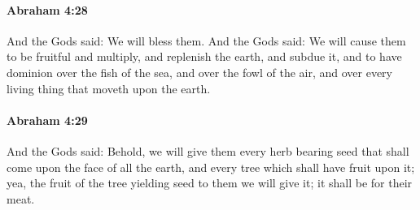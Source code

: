 
		\paragraph{Abraham 4:28} %
			\label{ABRAHAM-4-28}

			And the Gods said: We will bless them.  And the Gods said: We will cause them to be fruitful and multiply, and replenish the earth, and subdue it, and to have dominion over the fish of the sea, and over the fowl of the air, and over every living thing that moveth upon the earth.


		\paragraph{Abraham 4:29} %
			\label{ABRAHAM-4-29}

			And the Gods said: Behold, we will give them every herb bearing seed that shall come upon the face of all the earth, and every tree which shall have fruit upon it; yea, the fruit of the tree yielding seed to them we will give it; it shall be for their meat.

